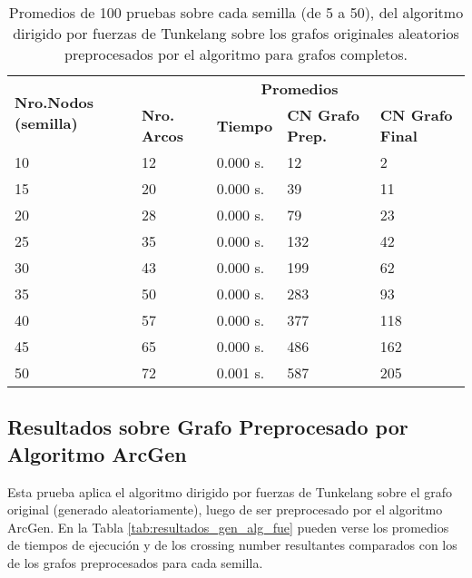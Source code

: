 \begin{table}[H]
	\caption{Promedios de 100 pruebas sobre cada semilla (de 5 a 50), del algoritmo dirigido por fuerzas de Tunkelang sobre los grafos originales aleatorios preprocesados por el algoritmo para grafos completos.}
	\label{tab:resultados_com_alg_fue}
	\begin{tabularx}{\linewidth}{|X|X|p{1.5cm}|X|X|}
		\hline
		\multirow{2}{2cm}{\textbf{Nro.Nodos (semilla)}} & \multicolumn{4}{c|}{\textbf{Promedios}} \\
		\cline{2-5}
		& \textbf{Nro. Arcos} & \textbf{Tiempo} & \textbf{CN Grafo Prep.} & \textbf{CN Grafo Final} \\
		\hline
		10 & 12 & 0.000 s. & 12 & 2 \\
		\hline
		15 & 20 & 0.000 s. & 39 & 11 \\
		\hline
		20 & 28 & 0.000 s. & 79 & 23 \\
		\hline
		25 & 35 & 0.000 s. & 132 & 42 \\
		\hline
		30 & 43 & 0.000 s. & 199 & 62 \\
		\hline
		35 & 50 & 0.000 s. & 283 & 93 \\
		\hline
		40 & 57 & 0.000 s. & 377 & 118 \\
		\hline
		45 & 65 & 0.000 s. & 486 & 162 \\
		\hline
		50 & 72 & 0.001 s. & 587 & 205 \\
		\hline
	\end{tabularx}
\end{table}

\subsection{Resultados sobre Grafo Preprocesado por Algoritmo ArcGen}
Esta prueba aplica el algoritmo dirigido por fuerzas de Tunkelang sobre el grafo original (generado aleatoriamente), luego de ser preprocesado por el algoritmo ArcGen. En la Tabla \ref{tab:resultados_gen_alg_fue} pueden verse los promedios de tiempos de ejecución y de los crossing number resultantes comparados con los de los grafos preprocesados para cada semilla.

